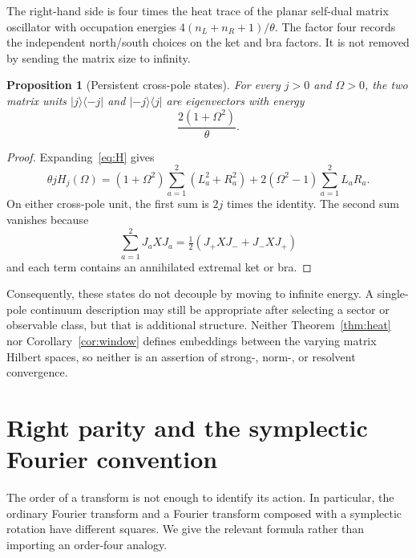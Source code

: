 \documentclass[11pt,a4paper]{article}
\newtheorem{proposition}[theorem]{Proposition}
\theoremstyle{remark}\newtheorem{remark}[theorem]{Remark}
\begin{document}
The right-hand side is four times the heat trace of the planar self-dual matrix oscillator with occupation energies $4(n_L+n_R+1)/\theta$.
The factor four records the independent north/south choices on the ket and bra factors.
It is not removed by sending the matrix size to infinity.

\begin{proposition}[Persistent cross-pole states]\label{prop:crosspole}
For every $j>0$ and $\Omega>0$, the two matrix units $|j\rangle\langle-j|$ and $|-j\rangle\langle j|$ are eigenvectors with energy
\begin{equation}\label{eq:crosspole}
 \frac{2(1+\Omega^2)}{\theta}.
\end{equation}
\end{proposition}
\begin{proof}
Expanding~\eqref{eq:H} gives
\begin{equation}
 \theta jH_j(\Omega)
 =(1+\Omega^2)\sum_{a=1}^2(L_a^2+R_a^2)
 +2(\Omega^2-1)\sum_{a=1}^2L_aR_a.
\end{equation}
On either cross-pole unit, the first sum is $2j$ times the identity.
The second sum vanishes because
\begin{equation}
 \sum_{a=1}^2J_aXJ_a=\tfrac12(J_+XJ_-+J_-XJ_+)
\end{equation}
and each term contains an annihilated extremal ket or bra.
\end{proof}

Consequently, these states do not decouple by moving to infinite energy.
A single-pole continuum description may still be appropriate after selecting a sector or observable class, but that is additional structure.
Neither Theorem~\ref{thm:heat} nor Corollary~\ref{cor:window} defines embeddings between the varying matrix Hilbert spaces, so neither is an assertion of strong-, norm-, or resolvent convergence.

\section{Right parity and the symplectic Fourier convention}
The order of a transform is not enough to identify its action.
In particular, the ordinary Fourier transform and a Fourier transform composed with a symplectic rotation have different squares.
We give the relevant formula rather than importing an order-four analogy.
\end{document}
